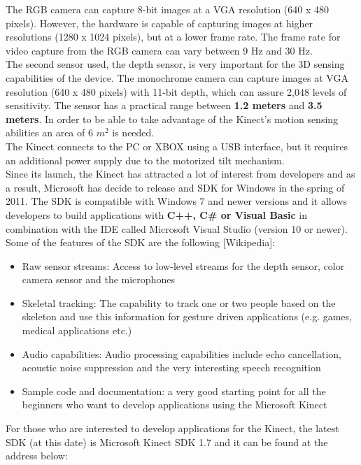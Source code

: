 \noindent
The RGB camera can capture 8-bit images at a VGA resolution (640 x 480 pixels). However, the hardware is capable of capturing images at higher resolutions (1280 x 1024 pixels), but at a lower frame rate. The frame rate for video capture from the RGB camera can vary between 9 Hz and 30 Hz.
\\
The second sensor used, the depth sensor, is very important for the 3D sensing capabilities of the device. The monochrome camera can capture images at VGA resolution (640 x 480 pixels) with 11-bit depth, which can assure 2,048 levels of sensitivity. The sensor has a practical range between {\bf 1.2 meters} and {\bf 3.5 meters}. In order to be able to take advantage of the Kinect's motion sensing abilities an area of 6 $m^2$ is needed. 
\\
The Kinect connects to the PC or XBOX using a USB interface, but it requires an additional power supply due to the motorized tilt mechanism. 
\\
Since its launch, the Kinect has attracted a lot of interest from developers and as a result, Microsoft has decide to release and SDK for Windows in the spring of 2011. The SDK is compatible with Windows 7 and newer versions and it allows developers to build applications with {\bf C++, C\# or Visual Basic} in combination with the IDE called Microsoft Visual Studio (version 10 or newer). 
\\
Some of the features of the SDK are the following [Wikipedia]:
\begin{itemize}
	\item Raw sensor streams: Access to low-level streams for the depth sensor, color camera sensor and the microphones
	\item Skeletal tracking: The capability to track one or two people based on the skeleton and use this information for gesture driven applications (e.g. games, medical applications etc.)
	\item Audio capabilities: Audio processing capabilities include echo cancellation, acoustic noise suppression and the very interesting speech recognition
	\item Sample code and documentation: a very good starting point for all the beginners who want to develop applications using the Microsoft Kinect
\end{itemize}

\noindent
For those who are interested to develop applications for the Kinect, the latest SDK (at this date) is Microsoft Kinect SDK 1.7 and it can be found at the address below:

